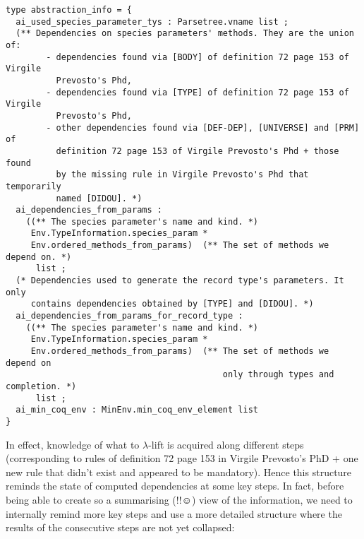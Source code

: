 {\footnotesize
\begin{lstlisting}[language=MyOCaml]
type abstraction_info = {
  ai_used_species_parameter_tys : Parsetree.vname list ;
  (** Dependencies on species parameters' methods. They are the union of:
        - dependencies found via [BODY] of definition 72 page 153 of Virgile
          Prevosto's Phd,
        - dependencies found via [TYPE] of definition 72 page 153 of Virgile
          Prevosto's Phd,
        - other dependencies found via [DEF-DEP], [UNIVERSE] and [PRM] of
          definition 72 page 153 of Virgile Prevosto's Phd + those found
          by the missing rule in Virgile Prevosto's Phd that temporarily
          named [DIDOU]. *)
  ai_dependencies_from_params :
    ((** The species parameter's name and kind. *)
     Env.TypeInformation.species_param *
     Env.ordered_methods_from_params)  (** The set of methods we depend on. *)
      list ;
  (* Dependencies used to generate the record type's parameters. It only
     contains dependencies obtained by [TYPE] and [DIDOU]. *)
  ai_dependencies_from_params_for_record_type :
    ((** The species parameter's name and kind. *)
     Env.TypeInformation.species_param *
     Env.ordered_methods_from_params)  (** The set of methods we depend on
                                           only through types and completion. *)
      list ;
  ai_min_coq_env : MinEnv.min_coq_env_element list
}
\end{lstlisting}
}

In effect, knowledge of what to $\lambda$-lift is acquired along
different steps (corresponding to rules of definition 72 page 153 in
Virgile Prevosto's PhD + one new rule that didn't exist and appeared
to be mandatory). Hence this structure reminds the state of computed
dependencies at some key steps. In fact, before being able to create
so a summarising (!!$\smiley$) view of the information, we need to
internally remind more key steps and use a more detailed structure
where the results of the consecutive steps are not yet collapsed:

